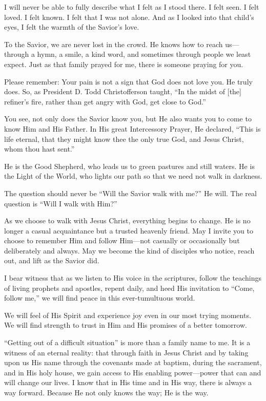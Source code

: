 \documentclass[letterpaper, 11pt]{report}
\newcommand{\intalkheader}[1]{
    \vspace{0.75em}
    \noindent{\normalsize\bfseries #1}
    \par\nopagebreak %
    \vspace{0.25em}
    \nopagebreak     %
}
\begin{document}
I will never be able to fully describe what I felt as I stood there. I felt seen. I felt loved. I felt known. I felt that I was not alone. And as I looked into that child’s eyes, I felt the warmth of the Savior’s love.

To the Savior, we are never lost in the crowd. He knows how to reach us—through a hymn, a smile, a kind word, and sometimes through people we least expect. Just as that family prayed for me, there is someone praying for you.

Please remember: Your pain is not a sign that God does not love you. He truly does. So, as President D. Todd Christofferson taught, “In the midst of [the] refiner’s fire, rather than get angry with God, get close to God.”

\intalkheader{We Are Invited to Walk with Him}

You see, not only does the Savior know you, but He also wants you to come to know Him and His Father. In His great Intercessory Prayer, He declared, “This is life eternal, that they might know thee the only true God, and Jesus Christ, whom thou hast sent.”

He is the Good Shepherd, who leads us to green pastures and still waters. He is the Light of the World, who lights our path so that we need not walk in darkness.

The question should never be “Will the Savior walk with me?” He will. The real question is “Will I walk with Him?”

As we choose to walk with Jesus Christ, everything begins to change. He is no longer a casual acquaintance but a trusted heavenly friend. May I invite you to choose to remember Him and follow Him—not casually or occasionally but deliberately and always. May we become the kind of disciples who notice, reach out, and lift as the Savior did.

I bear witness that as we listen to His voice in the scriptures, follow the teachings of living prophets and apostles, repent daily, and heed His invitation to “Come, follow me,” we will find peace in this ever-tumultuous world.

We will feel of His Spirit and experience joy even in our most trying moments. We will find strength to trust in Him and His promises of a better tomorrow.

“Getting out of a difficult situation” is more than a family name to me. It is a witness of an eternal reality: that through faith in Jesus Christ and by taking upon us His name through the covenants made at baptism, during the sacrament, and in His holy house, we gain access to His enabling power—power that can and will change our lives. I know that in His time and in His way, there is always a way forward. Because He not only knows the way; He is the way.
\end{document}
